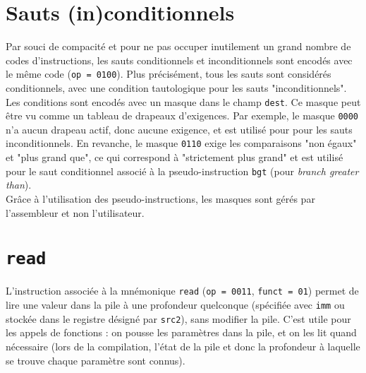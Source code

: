 \section{Sauts (in)conditionnels}

Par souci de compacité et pour ne pas occuper inutilement un grand nombre de
codes d'instructions, les sauts conditionnels et inconditionnels sont encodés
avec le même code (\texttt{op = 0100}). Plus précisément, tous les sauts sont
considérés conditionnels, avec une condition tautologique pour les sauts
"inconditionnels". \\

Les conditions sont encodés avec un masque\cite{bit_mask} dans le champ
\texttt{dest}. Ce masque peut être vu comme un tableau de drapeaux d'exigences.
Par exemple, le masque \texttt{0000} n'a aucun drapeau actif, donc aucune
exigence, et est utilisé pour pour les sauts inconditionnels. En revanche, le
masque \texttt{0110} exige les comparaisons "non égaux" et "plus grand que", ce
qui correspond à "strictement plus grand" et est utilisé pour le saut
conditionnel associé à la pseudo-instruction \texttt{bgt} (pour \textit{branch
greater than}). \\

Grâce à l'utilisation des pseudo-instructions, les masques sont gérés par
l'assembleur et non l'utilisateur.

\section{\texttt{read}}

L'instruction associée à la mnémonique \texttt{read} (\texttt{op = 0011},
\texttt{funct = 01}) permet de lire une valeur dans la pile à une profondeur
quelconque (spécifiée avec \texttt{imm} ou stockée dans le registre désigné par
\texttt{src2}), sans modifier la pile. C'est utile pour les appels de
fonctions : on pousse les paramètres dans la pile, et on les lit quand
nécessaire (lors de la compilation, l'état de la pile et donc la
profondeur à laquelle se trouve chaque paramètre sont connus).
